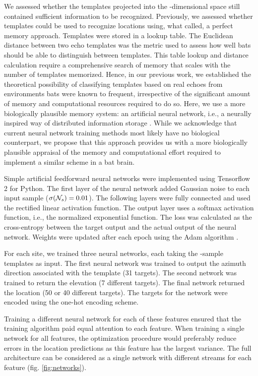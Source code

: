 \documentclass[preprint,5p]{elsarticle}
\begin{document}
We assessed whether the templates projected into the \pca-dimensional space still contained sufficient information to be recognized. Previously, we assessed whether templates could be used to recognize locations using, what \citet{Baddeley2012} called, a perfect memory approach. Templates were stored in a lookup table. The Euclidean distance between two echo templates was the metric used to assess how well bats should be able to distinguish between templates. This table lookup and distance calculation require a comprehensive search of memory that scales with the number of templates memorized. Hence, in our previous work, we established the theoretical possibility of classifying templates based on real echoes from environments bats were known to frequent, irrespective of the significant amount of memory and computational resources required to do so.  Here, we use a more biologically plausible memory system: an artificial neural network, i.e., a neurally inspired way of distributed information storage \citep{Mcleod1998}. While we acknowledge that current neural network training methods most likely have no biological counterpart, we propose that this approach provides us with a more biologically plausible appraisal of the memory and computational effort required to implement a similar scheme in a bat brain.

Simple artificial feedforward neural networks were implemented using Tensorflow 2 for Python. The first layer of the neural network added Gaussian noise to each input sample ($\sigma(\mathcal{N}_s) = 0.01$). The following layers were fully connected and used the rectified linear activation function. The output layer uses a softmax activation function, i.e., the normalized exponential function. The loss was calculated as the cross-entropy between the target output and the actual output of the neural network. Weights were updated after each epoch using the Adam algorithm \citep{Kingma2014} .

For each site, we trained three neural networks, each taking the \pca-sample templates as input. The first neural network was trained to output the azimuth direction associated with the template (31 targets). The second network was trained to return the elevation (7 different targets). The final network returned the location (50 or 40 different targets). The targets for the network were encoded using the one-hot encoding scheme. 

Training a different neural network for each of these features ensured that the training algorithm paid equal attention to each feature. When training a single network for all features, the optimization procedure would preferably reduce errors in the location predictions as this feature has the largest variance. The full architecture can be considered as a single network with different streams for each feature (fig. \ref{fig:networks}).
\end{document}
